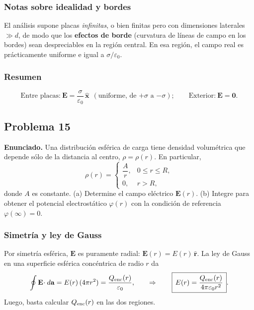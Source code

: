 \documentclass{article}
\begin{document}
\subsubsection*{Notas sobre idealidad y bordes}
El análisis supone placas \emph{infinitas}, o bien finitas pero con dimensiones laterales $\gg d$, de modo que los \textbf{efectos de borde} (curvatura de líneas de campo en los bordes) sean despreciables en la región central. En esa región, el campo real es prácticamente uniforme e igual a $\sigma/\varepsilon_0$.

\subsubsection*{Resumen}
\[
\boxed{\ \text{Entre placas:}\ \mathbf E=\dfrac{\sigma}{\varepsilon_0}\,\hat{\mathbf x}\ \ (\text{uniforme, de $+\sigma$ a $-\sigma$});\qquad
\text{Exterior:}\ \mathbf E=\mathbf 0.\ }
\]


\subsection{Problema 15} \vspace{0.5cm}

\textbf{Enunciado.} Una distribución esférica de carga tiene densidad volumétrica que depende sólo de la distancia al centro, $\rho=\rho(r)$. En particular,
\[
\rho(r)=\begin{cases}
\dfrac{A}{r}, & 0\le r\le R,\\[4pt]
0, & r>R,
\end{cases}
\]
donde $A$ es constante. (a) Determine el campo eléctrico $\mathbf E(r)$. (b) Integre para obtener el potencial electrostático $\varphi(r)$ con la condición de referencia $\varphi(\infty)=0$.

\subsubsection*{Simetría y ley de Gauss}
Por simetría esférica, $\mathbf E$ es puramente radial: $\mathbf E(r)=E(r)\,\hat{\mathbf r}$.  
La ley de Gauss en una superficie esférica concéntrica de radio $r$ da
\[
\oint \mathbf E\!\cdot d\mathbf a=E(r)\,(4\pi r^2)=\frac{Q_{\rm enc}(r)}{\varepsilon_0},
\qquad \Rightarrow\qquad
\boxed{\,E(r)=\dfrac{Q_{\rm enc}(r)}{4\pi\varepsilon_0 r^2}\,}.
\]
Luego, basta calcular $Q_{\rm enc}(r)$ en las dos regiones.
\end{document}
